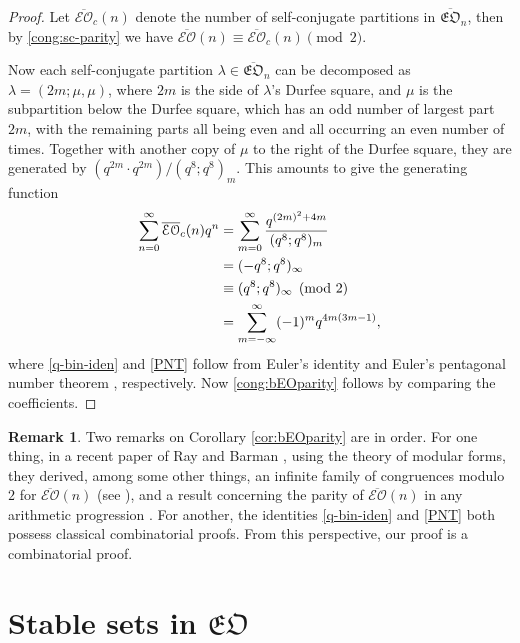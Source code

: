 \documentclass[12pt,reqno]{amsart}
\numberwithin{equation}{section}
\theoremstyle{plain}
\theoremstyle{definition}
\newtheorem{remark}[theorem]{Remark}
\begin{document}
\begin{proof}
Let $\overline{\mathcal{EO}}_c(n)$ denote the number of self-conjugate partitions in
$\overline{\mathfrak{EO}}_n$, then by \eqref{cong:sc-parity} we have $\overline{\mathcal{EO}}(n)\equiv\overline{\mathcal{EO}}_c(n)\pmod2$.

Now each self-conjugate partition $\lambda\in\overline{\mathfrak{EO}}_n$ can be decomposed as
$\lambda=(2m;\mu,\mu)$, where $2m$ is the side of $\lambda$'s Durfee square, and $\mu$ is the subpartition
below the Durfee square, which has an odd number of largest part $2m$, with the remaining parts all being
even and all occurring an even number of times. Together with another copy of $\mu$ to the right of the
Durfee square, they are generated by $(q^{2m}\cdot q^{2m})/(q^8;q^8)_{m}$. This amounts to give the
generating function
\begin{align}
\sum_{n=0}^{\infty}\overline{\mathcal{EO}}_c(n)q^n
 &=\sum_{m=0}^{\infty}\frac{q^{(2m)^2+4m}}{(q^8;q^8)_m}\notag\\
 &=(-q^8;q^8)_{\infty}\label{q-bin-iden}\\
 &\equiv (q^8;q^8)_{\infty}\pmod 2\notag\\
 &=\sum_{m=-\infty}^{\infty}(-1)^m q^{4m(3m-1)},\label{PNT}
\end{align}
where \eqref{q-bin-iden} and \eqref{PNT} follow from Euler's identity \cite[p.~19, Eq.~(2.2.6)]{and} and
Euler's pentagonal number theorem \cite[p.~11, Corollary 1.7]{and}, respectively. Now \eqref{cong:bEOparity}
follows by comparing the coefficients.
\end{proof}

\begin{remark}
Two remarks on Corollary \ref{cor:bEOparity} are in order. For one thing, in a recent paper of Ray and
Barman \cite{RB}, using the theory of modular forms, they derived, among some other things, an infinite
family of congruences modulo $2$ for $\overline{\mathcal{EO}}(n)$ (see \cite[Theorem 1.1]{RB}), and a result
concerning the parity of $\overline{\mathcal{EO}}(n)$ in any arithmetic progression \cite[Theorem 1.4]{RB}.
For another, the identities \eqref{q-bin-iden} and \eqref{PNT} both possess classical combinatorial proofs.
From this perspective, our proof is a combinatorial proof.
\end{remark}




\section{Stable sets in \texorpdfstring{$\mathfrak{EO}$}{EO}}\label{sec:EO}
\end{document}
